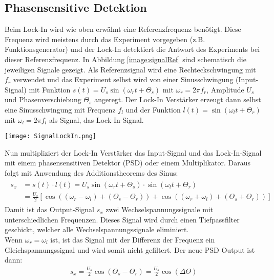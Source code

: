 \subsection*{Phasensensitive Detektion}
Beim Lock-In wird wie oben erwähnt eine Referenzfrequenz benötigt. Diese Frequenz wird meistens durch das Experiment vorgegeben (z.B. Funktionsgenerator) und der Lock-In detektiert die Antwort des Experiments bei dieser Referenzfrequenz. In Abbildung \ref{image:signalRef} sind schematisch die jeweiligen Signale gezeigt. Als Referenzsignal wird eine Rechteckschwingung mit $f_{r}$ verwendet und das Experiment selbst wird von einer Sinusschwingung (Input-Signal) mit Funktion $s(t)=U_{s}\sin(\omega_{r}t + \Theta_{s})$ mit $\omega_{r}=2\pi f_{r}$, Amplitude $U_s$ und Phasenverschiebung $\Theta_{s}$ angeregt. Der Lock-In Verstärker erzeugt dann selbst eine Sinusschwingung mit Frequenz $f_l$ und der Funktion $l(t) = \sin(\omega_{l}t + \Theta_{r})$ mit $\omega_{l}=2\pi f_{l}$ als Signal, das Lock-In-Signal.
\begin{center}
    \texttt{[image: SignalLockIn.png]}
    \label{image:signalRef}
\end{center}
Nun multipliziert der Lock-In Verstärker das Input-Signal und das Lock-In-Signal mit einem phasensensitiven Detektor (PSD) oder einem Multiplikator. Daraus folgt mit Anwendung des Additionstheorems des Sinus:
\begin{gather}
    \begin{aligned}
        s_{x} &= s(t)\cdot l(t) = U_{s}\sin(\omega_{r}t + \Theta_{s}) \cdot \sin(\omega_{l}t + \Theta_{r})\\
                &= \frac{U_{s}}{2}\left[\cos((\omega_{r}-\omega_{l}) + (\Theta_s - \Theta_r)) + \cos((\omega_{r}+\omega_{l}) + (\Theta_s + \Theta_r))\right]
    \end{aligned}
\end{gather}
Damit ist das Output-Signal $s_x$ zwei Wechselspannungssignale mit unterschiedlichen Frequenzen. Dieses Signal wird durch einen Tiefpassfilter geschickt, welcher alle Wechselspannungssignale eliminiert.\\ Wenn $\omega_r = \omega_l$ ist, ist das Signal mit der Differenz der Frequenz ein Gleichspannungssignal und wird somit nicht gefiltert. Der neue PSD Output ist dann:
\begin{gather}
    s_{x} = \frac{U_s}{2} \cos(\Theta_s-\Theta_r) = \frac{U_s}{2} \cos(\Delta\Theta)  
\end{gather}
